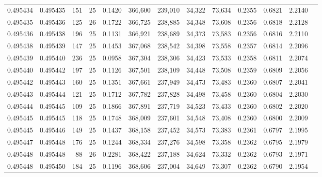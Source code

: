 \begin{tabular}{rrrrrrrrrrrrr}
0.495434 & 0.495435 &   151 &  25 &                                     0.1420 & 366,600 & 239,010 &  34,322 &  73,634 & 0.2355 & 0.6821 & 2.2140 \\
0.495435 & 0.495436 &   125 &  26 &                                     0.1722 & 366,725 & 238,885 &  34,348 &  73,608 & 0.2356 & 0.6818 & 2.2128 \\
0.495436 & 0.495438 &   196 &  25 &                                     0.1131 & 366,921 & 238,689 &  34,373 &  73,583 & 0.2356 & 0.6816 & 2.2110 \\
0.495438 & 0.495439 &   147 &  25 &                                     0.1453 & 367,068 & 238,542 &  34,398 &  73,558 & 0.2357 & 0.6814 & 2.2096 \\
0.495439 & 0.495440 &   236 &  25 &                                     0.0958 & 367,304 & 238,306 &  34,423 &  73,533 & 0.2358 & 0.6811 & 2.2074 \\
0.495440 & 0.495442 &   197 &  25 &                                     0.1126 & 367,501 & 238,109 &  34,448 &  73,508 & 0.2359 & 0.6809 & 2.2056 \\
0.495442 & 0.495443 &   160 &  25 &                                     0.1351 & 367,661 & 237,949 &  34,473 &  73,483 & 0.2360 & 0.6807 & 2.2041 \\
0.495443 & 0.495444 &   121 &  25 &                                     0.1712 & 367,782 & 237,828 &  34,498 &  73,458 & 0.2360 & 0.6804 & 2.2030 \\
0.495444 & 0.495445 &   109 &  25 &                                     0.1866 & 367,891 & 237,719 &  34,523 &  73,433 & 0.2360 & 0.6802 & 2.2020 \\
0.495445 & 0.495445 &   118 &  25 &                                     0.1748 & 368,009 & 237,601 &  34,548 &  73,408 & 0.2360 & 0.6800 & 2.2009 \\
0.495445 & 0.495446 &   149 &  25 &                                     0.1437 & 368,158 & 237,452 &  34,573 &  73,383 & 0.2361 & 0.6797 & 2.1995 \\
0.495447 & 0.495448 &   176 &  25 &                                     0.1244 & 368,334 & 237,276 &  34,598 &  73,358 & 0.2362 & 0.6795 & 2.1979 \\
0.495448 & 0.495448 &    88 &  26 &                                     0.2281 & 368,422 & 237,188 &  34,624 &  73,332 & 0.2362 & 0.6793 & 2.1971 \\
0.495448 & 0.495450 &   184 &  25 &                                     0.1196 & 368,606 & 237,004 &  34,649 &  73,307 & 0.2362 & 0.6790 & 2.1954 \\

\end{tabular}
